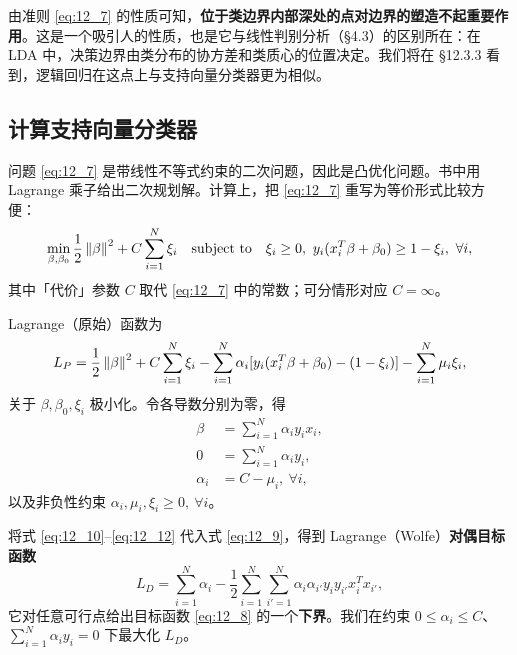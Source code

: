 \begin{remark}
由准则 \ref{eq:12_7} 的性质可知，\textbf{位于类边界内部深处的点对边界的塑造不起重要作用}。这是一个吸引人的性质，也是它与线性判别分析（§4.3）的区别所在：在 LDA 中，决策边界由类分布的协方差和类质心的位置决定。我们将在 §12.3.3 看到，逻辑回归在这点上与支持向量分类器更为相似。
\end{remark}

\subsection{计算支持向量分类器}

问题 \ref{eq:12_7} 是带线性不等式约束的二次问题，因此是凸优化问题。书中用 Lagrange 乘子给出二次规划解。计算上，把 \ref{eq:12_7} 重写为等价形式比较方便：
\begin{equation}
\min_{\beta,\beta_0} \frac12\left\lVert\beta\right\rVert^2 + C\sum_{i=1}^{N}\xi_i \quad \text{subject to}\quad
\xi_i \ge 0,\ y_i(x_i^T\beta+\beta_0)\ge 1-\xi_i,\ \forall i, \label{eq:12_8}
\end{equation}
其中「代价」参数 $C$ 取代 \ref{eq:12_7} 中的常数；可分情形对应 $C=\infty$。

Lagrange（原始）函数为
\begin{equation}
L_P = \frac12\left\lVert\beta\right\rVert^2 + C\sum_{i=1}^{N}\xi_i - \sum_{i=1}^{N}\alpha_i [y_i(x_i^T\beta+\beta_0) - (1-\xi_i)] - \sum_{i=1}^{N}\mu_i \xi_i, \label{eq:12_9}
\end{equation}
关于 $\beta,\beta_0,\xi_i$ 极小化。令各导数分别为零，得
\begin{align}
\beta &= \sum_{i=1}^{N}\alpha_i y_i x_i, \label{eq:12_10}\\
0 &= \sum_{i=1}^{N}\alpha_i y_i, \label{eq:12_11}\\
\alpha_i &= C - \mu_i,\ \forall i, \label{eq:12_12}
\end{align}
以及非负性约束 $\alpha_i,\mu_i,\xi_i\ge 0,\ \forall i$。

将式 \ref{eq:12_10}--\ref{eq:12_12} 代入式 \ref{eq:12_9}，得到 Lagrange（Wolfe）\textbf{对偶目标函数}
\begin{equation}
L_D = \sum_{i=1}^{N}\alpha_i - \frac12 \sum_{i=1}^{N}\sum_{i'=1}^{N}\alpha_i \alpha_{i'} y_i y_{i'} x_i^T x_{i'}, \label{eq:12_13}
\end{equation}
它对任意可行点给出目标函数 \ref{eq:12_8} 的一个\textbf{下界}。我们在约束 $0\le \alpha_i\le C$、$\sum_{i=1}^{N}\alpha_i y_i = 0$ 下最大化 $L_D$。

